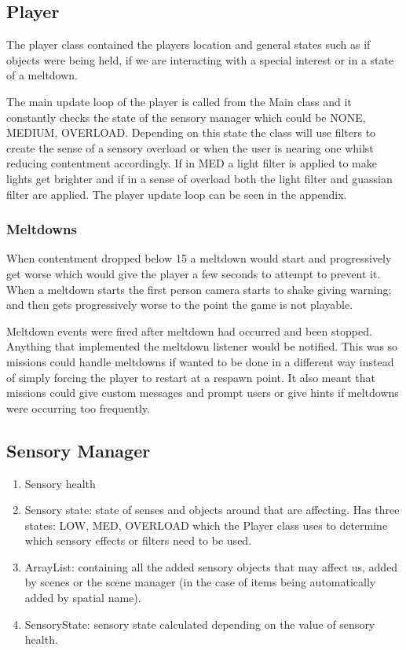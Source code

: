 \documentclass[11pt]{report}
\begin{document}
\subsection{Player}
The player class contained the players location and general states such as if objects were being held, if we are interacting with a special interest or in a state of a meltdown.

The main update loop of the player is called from the Main class and it constantly checks the state of the sensory manager which could be NONE, MEDIUM, OVERLOAD. Depending on this state the class will use filters to create the sense of a sensory overload or when the user is nearing one whilst reducing contentment accordingly. If in MED a light filter is applied to make lights get brighter and if in a sense of overload both the light filter and guassian filter are applied. The player update loop can be seen in the appendix.  
 
\subsubsection{Meltdowns}
When contentment dropped below 15 a meltdown would start and progressively get worse which would give the player a few seconds to attempt to prevent it. When a meltdown starts the first person camera starts to shake giving warning; and then gets progressively worse to the point the game is not playable. 

Meltdown events were fired after meltdown had occurred and been stopped. Anything that implemented the meltdown listener would be notified. This was so missions could handle meltdowns if wanted to be done in a different way instead of simply forcing the player to restart at a respawn point. It also meant that missions could give custom messages and prompt users or give hints if meltdowns were occurring too frequently.


\subsection{Sensory Manager}

\begin{enumerate}
\item Sensory health
\item Sensory state: state of senses and objects around that are affecting. Has three states: LOW, MED, OVERLOAD which the Player class uses to determine which sensory effects or filters need to be used.
\item ArrayList: containing all the added sensory objects that may affect us, added by scenes or the scene manager (in the case of items being automatically added by spatial name). 
\item SensoryState: sensory state calculated depending on the value of sensory health. 
\end{enumerate}
\end{document}
